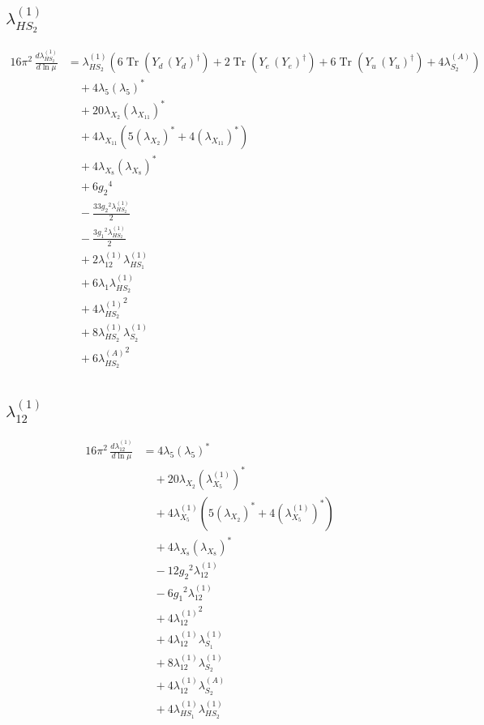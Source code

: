 \documentclass[10pt,a4paper]{article}
\begin{document}
\subsection*{$\lambda_{HS_2}^{(1)}$}
\begin{align*}
16\pi^2\,\frac{d \lambda_{HS_2}^{(1)}}{d\ln\mu} &={\lambda_{HS_2}^{(1)}} (6 \operatorname{Tr}\!\left({Y_d}\,\left({Y_d}\right)^{\dagger}\right)+2 \operatorname{Tr}\!\left({Y_e}\,\left({Y_e}\right)^{\dagger}\right)+6 \operatorname{Tr}\!\left({Y_u}\,\left({Y_u}\right)^{\dagger}\right)+4 {\lambda_{S_2}^{(A)}}) \\
&\quad +4 {\lambda_5} \left({\lambda_5}\right)^{*} \\
&\quad +20 {\lambda_{X_{2}}} \left({\lambda_{X_{11}}}\right)^{*} \\
&\quad +4 {\lambda_{X_{11}}} (5 \left({\lambda_{X_{2}}}\right)^{*}+4 \left({\lambda_{X_{11}}}\right)^{*}) \\
&\quad +4 {\lambda_{X_{8}}} \left({\lambda_{X_{8}}}\right)^{*} \\
&\quad +6 {g_2}^4 \\
&\quad -\frac{33 {g_2}^2 {\lambda_{HS_2}^{(1)}}}{2} \\
&\quad -\frac{3 {g_1}^2 {\lambda_{HS_2}^{(1)}}}{2} \\
&\quad +2 {\lambda_{12}^{(1)}} {\lambda_{HS_1}^{(1)}} \\
&\quad +6 {\lambda_1} {\lambda_{HS_2}^{(1)}} \\
&\quad +4 {\lambda_{HS_2}^{(1)}}^2 \\
&\quad +8 {\lambda_{HS_2}^{(1)}} {\lambda_{S_2}^{(1)}} \\
&\quad +6 {\lambda_{HS_2}^{(A)}}^2 \\
\end{align*}
\subsection*{$\lambda_{12}^{(1)}$}
\begin{align*}
16\pi^2\,\frac{d \lambda_{12}^{(1)}}{d\ln\mu} &=4 {\lambda_5} \left({\lambda_5}\right)^{*} \\
&\quad +20 {\lambda_{X_{2}}} \left({\lambda_{X_{5}}^{(1)}}\right)^{*} \\
&\quad +4 {\lambda_{X_{5}}^{(1)}} (5 \left({\lambda_{X_{2}}}\right)^{*}+4 \left({\lambda_{X_{5}}^{(1)}}\right)^{*}) \\
&\quad +4 {\lambda_{X_{8}}} \left({\lambda_{X_{8}}}\right)^{*} \\
&\quad -12 {g_2}^2 {\lambda_{12}^{(1)}} \\
&\quad -6 {g_1}^2 {\lambda_{12}^{(1)}} \\
&\quad +4 {\lambda_{12}^{(1)}}^2 \\
&\quad +4 {\lambda_{12}^{(1)}} {\lambda_{S_1}^{(1)}} \\
&\quad +8 {\lambda_{12}^{(1)}} {\lambda_{S_2}^{(1)}} \\
&\quad +4 {\lambda_{12}^{(1)}} {\lambda_{S_2}^{(A)}} \\
&\quad +4 {\lambda_{HS_1}^{(1)}} {\lambda_{HS_2}^{(1)}} \\
\end{align*}
\end{document}
